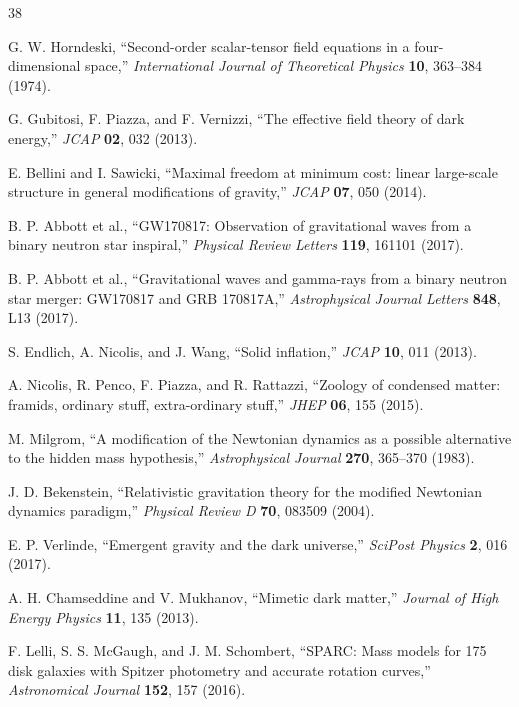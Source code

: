 \documentclass[12pt]{article}
\begin{document}
\begin{thebibliography}{38}

G. W. Horndeski, ``Second-order scalar-tensor field equations in a four-dimensional space,'' \textit{International Journal of Theoretical Physics} \textbf{10}, 363--384 (1974).

G. Gubitosi, F. Piazza, and F. Vernizzi, ``The effective field theory of dark energy,'' \textit{JCAP} \textbf{02}, 032 (2013).

E. Bellini and I. Sawicki, ``Maximal freedom at minimum cost: linear large-scale structure in general modifications of gravity,'' \textit{JCAP} \textbf{07}, 050 (2014).

B. P. Abbott et al., ``GW170817: Observation of gravitational waves from a binary neutron star inspiral,'' \textit{Physical Review Letters} \textbf{119}, 161101 (2017).

B. P. Abbott et al., ``Gravitational waves and gamma-rays from a binary neutron star merger: GW170817 and GRB 170817A,'' \textit{Astrophysical Journal Letters} \textbf{848}, L13 (2017).

S. Endlich, A. Nicolis, and J. Wang, ``Solid inflation,'' \textit{JCAP} \textbf{10}, 011 (2013).

A. Nicolis, R. Penco, F. Piazza, and R. Rattazzi, ``Zoology of condensed matter: framids, ordinary stuff, extra-ordinary stuff,'' \textit{JHEP} \textbf{06}, 155 (2015).

M. Milgrom, ``A modification of the Newtonian dynamics as a possible alternative to the hidden mass hypothesis,'' \textit{Astrophysical Journal} \textbf{270}, 365--370 (1983).

J. D. Bekenstein, ``Relativistic gravitation theory for the modified Newtonian dynamics paradigm,'' \textit{Physical Review D} \textbf{70}, 083509 (2004).

E. P. Verlinde, ``Emergent gravity and the dark universe,'' \textit{SciPost Physics} \textbf{2}, 016 (2017).

A. H. Chamseddine and V. Mukhanov, ``Mimetic dark matter,'' \textit{Journal of High Energy Physics} \textbf{11}, 135 (2013).

F. Lelli, S. S. McGaugh, and J. M. Schombert, ``SPARC: Mass models for 175 disk galaxies with Spitzer photometry and accurate rotation curves,'' \textit{Astronomical Journal} \textbf{152}, 157 (2016).


\end{thebibliography}
\end{document}
